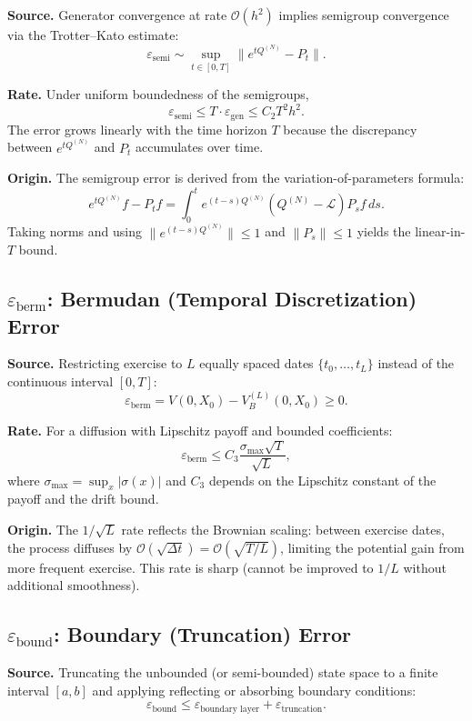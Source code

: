 \documentclass[11pt,a4paper,openany]{book}
\theoremstyle{definition}
\theoremstyle{plain}
\theoremstyle{remark}
\newcommand{\1}{\mathbbm{1}}
\begin{document}
\textbf{Source.} Generator convergence at rate $\mathcal{O}(h^{2})$ implies semigroup convergence via the Trotter--Kato estimate:
\[
\varepsilon_{\text{semi}} \sim \sup_{t \in [0,T]} \|e^{t Q^{(N)}} - P_{t}\|.
\]

\textbf{Rate.} Under uniform boundedness of the semigroups,
\[
\varepsilon_{\text{semi}} \leq T \cdot \varepsilon_{\text{gen}} \leq C_{2} T^{2} h^{2}.
\]
The error grows linearly with the time horizon $T$ because the discrepancy between $e^{t Q^{(N)}}$ and $P_{t}$ accumulates over time.

\textbf{Origin.} The semigroup error is derived from the variation-of-parameters formula:
\[
e^{t Q^{(N)}} f - P_{t} f = \int_{0}^{t} e^{(t-s) Q^{(N)}} (Q^{(N)} - \mathcal{L}) P_{s} f \, ds.
\]
Taking norms and using $\|e^{(t-s) Q^{(N)}}\| \leq 1$ and $\|P_{s}\| \leq 1$ yields the linear-in-$T$ bound.

\subsection{$\varepsilon_{\text{berm}}$: Bermudan (Temporal Discretization) Error}

\textbf{Source.} Restricting exercise to $L$ equally spaced dates $\{t_{0}, \ldots, t_{L}\}$ instead of the continuous interval $[0,T]$:
\[
\varepsilon_{\text{berm}} = V(0,X_{0}) - V_{B}^{(L)}(0,X_{0}) \geq 0.
\]

\textbf{Rate.} For a diffusion with Lipschitz payoff and bounded coefficients:
\[
\varepsilon_{\text{berm}} \leq C_{3} \frac{\sigma_{\max} \sqrt{T}}{\sqrt{L}},
\]
where $\sigma_{\max} = \sup_{x} |\sigma(x)|$ and $C_{3}$ depends on the Lipschitz constant of the payoff and the drift bound.

\textbf{Origin.} The ${1}/{\sqrt{L}}$ rate reflects the Brownian scaling: between exercise dates, the process diffuses by $\mathcal{O}(\sqrt{\Delta t}) = \mathcal{O}(\sqrt{T/L})$, limiting the potential gain from more frequent exercise. This rate is sharp (cannot be improved to $1/L$ without additional smoothness).

\subsection{$\varepsilon_{\text{bound}}$: Boundary (Truncation) Error}

\textbf{Source.} Truncating the unbounded (or semi-bounded) state space to a finite interval $[a,b]$ and applying reflecting or absorbing boundary conditions:
\[
\varepsilon_{\text{bound}} \leq \varepsilon_{\text{boundary layer}} + \varepsilon_{\text{truncation}}.
\]
\end{document}
